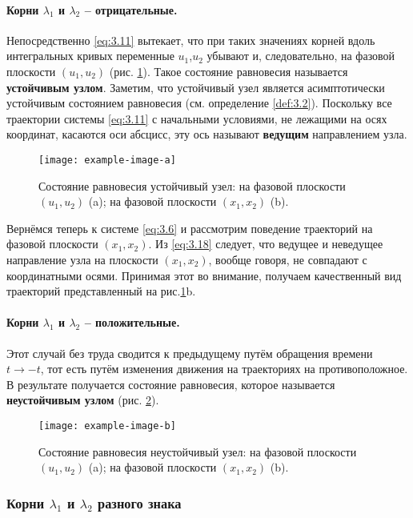 \paragraph{Корни $\lambda_1$ и $\lambda_2$ -- отрицательные.}%
\label{par:korni_lambda_1_i_lambda_2_otritsatel_nye_}

Непосредственно \eqref{eq:3.11} вытекает, что при таких значениях корней вдоль интегральных кривых переменные $u_1$,$u_2$ убывают и, следовательно, на фазовой плоскости $(u_1,u_2)$ (рис. \ref{fig:3.3}). Такое состояние равновесия называется \textbf{ устойчивым узлом}. Заметим, что устойчивый узел является асимптотически устойчивым состоянием равновесия (см. определение \ref{def:3.2}). Поскольку все траектории системы \eqref{eq:3.11} с начальными условиями, не лежащими на осях координат, касаются оси абсцисс, эту ось называют \textbf{ ведущим} направлением узла.
\begin{figure}[h!]
        \centering
        \texttt{[image: example-image-a]}
        \caption{Состояние равновесия устойчивый узел: на фазовой плоскости $( u_1,u_2)$ (a); на фазовой плоскости $(x_1,x_2)$ (b).}
        \label{fig:3.3}
\end{figure}
Вернёмся теперь к системе \eqref{eq:3.6} и рассмотрим поведение траекторий на фазовой плоскости $(x_1,x_2)$. Из \eqref{eq:3.18} следует, что ведущее и неведущее направление узла на плоскости $(x_1,x_2)$, вообще говоря, не совпадают с координатными осями. Принимая этот во внимание, получаем качественный вид траекторий представленный на рис.\ref{fig:3.3}b.

\paragraph{Корни $\lambda_1$ и $\lambda_2$ -- положительные.}%
\label{par:korni_lambda_1_i_lambda_2_polozhitel_nye_}

Этот случай без труда сводится к предыдущему путём обращения времени $t \to - t$, тот есть путём изменения движения на траекториях на противоположное. В результате получается состояние равновесия, которое называется 
\textbf{ неустойчивым узлом} (рис. \ref{fig:3.4}). 
\begin{figure}[h!]
        \centering
        \texttt{[image: example-image-b]}
        \caption{Состояние равновесия неустойчивый узел: на фазовой плоскости $(u_1,u_2)$ (a); на фазовой плоскости $(x_1,x_2)$ (b).}
        \label{fig:3.4}
\end{figure}
\subsubsection{Корни $\lambda_1$ и $\lambda_2$ разного знака}%
\label{ssub:korni_lambda_1_i_lambda_2_raznogo_znaka}

